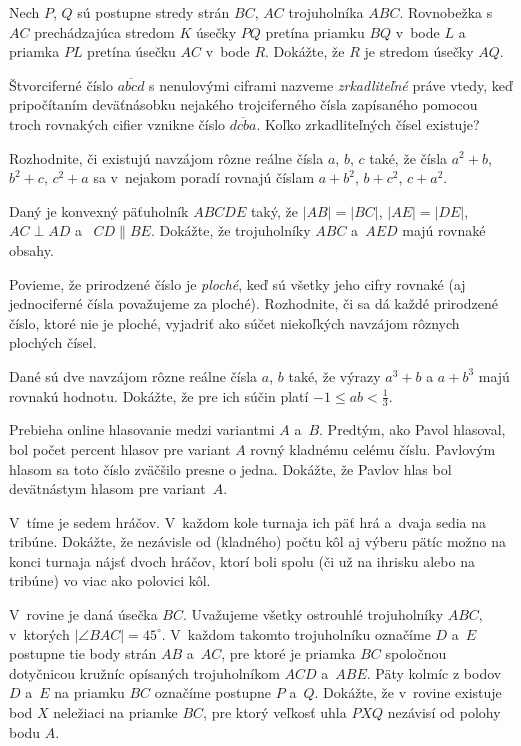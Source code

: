 {%
Nech $P$, $Q$ sú postupne stredy strán $BC$, $AC$ trojuholníka $ABC$. Rovnobežka s~$AC$ prechádzajúca stredom $K$ úsečky $PQ$ pretína priamku $BQ$ v~bode $L$ a priamka $PL$ pretína úsečku $AC$ v~bode $R$. Dokážte, že $R$ je stredom úsečky $AQ$.
}

{%
Štvorciferné číslo $\overline{abcd}$ s nenulovými ciframi nazveme \emph{zrkadliteľné} práve vtedy, keď pripočítaním deväťnásobku nejakého trojciferného čísla zapísaného pomocou troch rovnakých cifier vznikne číslo $\overline{dcba}$. Koľko zrkadliteľných čísel existuje?
}

{%
Rozhodnite, či existujú navzájom rôzne reálne čísla $a$, $b$, $c$ také, že čísla $a^2+b$, $b^2+c$, $c^2+a$ sa v~nejakom poradí rovnajú číslam $a+b^2$, $b+c^2$, $c+a^2$.
}

{%
Daný je konvexný päťuholník $ABCDE$ taký, že $|AB|=|BC|$, $|AE|=|DE|$, $AC \perp AD$ a ~$CD \parallel BE$.
Dokážte, že trojuholníky $ABC$ a~$AED$ majú rovnaké obsahy.
}

{%
Povieme, že prirodzené číslo je \emph{ploché}, keď sú všetky jeho cifry rovnaké (aj jednociferné čísla považujeme za ploché).
Rozhodnite, či sa dá každé prirodzené číslo, ktoré nie je ploché, vyjadriť ako súčet niekoľkých navzájom rôznych plochých čísel.
}

{%
Dané sú dve navzájom rôzne reálne čísla $a$, $b$ také, že výrazy $a^3 + b$ a $a + b^3$ majú rovnakú hodnotu. Dokážte, že pre ich súčin platí $-1\le ab<\frac13$.
}

{%
Prebieha online hlasovanie medzi variantmi $A$ a~$B$. Predtým, ako Pavol hlasoval, bol počet percent hlasov pre variant $A$ rovný kladnému celému číslu.
Pavlovým hlasom sa toto číslo zväčšilo presne o jedna. Dokážte, že Pavlov hlas bol devätnástym hlasom pre variant~$A$.
}

{%
V~tíme je sedem hráčov. V~každom kole turnaja ich päť hrá a~dvaja sedia na tribúne. Dokážte, že nezávisle od (kladného) počtu kôl aj výberu pätíc možno na konci turnaja nájsť dvoch hráčov, ktorí boli spolu (či už na ihrisku alebo na tribúne) vo viac ako polovici kôl.
}

{%
V~rovine je daná úsečka $BC$. Uvažujeme všetky ostrouhlé trojuholníky $ABC$, v~ktorých $|\angle BAC|=45^\circ$.
V~každom takomto trojuholníku označíme $D$ a~$E$ postupne tie body strán $AB$ a~$AC$, pre ktoré je priamka $BC$ spoločnou dotyčnicou kružníc opísaných trojuholníkom $ACD$ a~$ABE$. Päty kolmíc z bodov $D$ a~$E$ na priamku $BC$ označíme postupne $P$ a~$Q$. Dokážte, že v~rovine existuje bod $X$ neležiaci na priamke $BC$, pre ktorý veľkosť uhla $PXQ$ nezávisí od polohy bodu $A$.
}

